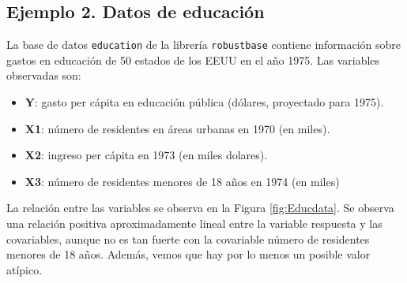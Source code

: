 \documentclass[
]{article}
\newenvironment{Shaded}{\begin{snugshade}}{\end{snugshade}}
\newcommand{\CommentTok}[1]{\textcolor[rgb]{0.56,0.35,0.01}{\textit{#1}}}
\newcommand{\DecValTok}[1]{\textcolor[rgb]{0.00,0.00,0.81}{#1}}
\newcommand{\FunctionTok}[1]{\textcolor[rgb]{0.13,0.29,0.53}{\textbf{#1}}}
\newcommand{\NormalTok}[1]{#1}
\newcommand{\OtherTok}[1]{\textcolor[rgb]{0.56,0.35,0.01}{#1}}
\newcommand{\SpecialCharTok}[1]{\textcolor[rgb]{0.81,0.36,0.00}{\textbf{#1}}}
\newcommand{\StringTok}[1]{\textcolor[rgb]{0.31,0.60,0.02}{#1}}
\providecommand{\tightlist}{%
  \setlength{\itemsep}{0pt}\setlength{\parskip}{0pt}}
\begin{document}
\hypertarget{ejemplo-2.-datos-de-educaciuxf3n}{%
\subsection*{Ejemplo 2. Datos de educación}\label{ejemplo-2.-datos-de-educaciuxf3n}}

La base de datos \texttt{education} de la librería \texttt{robustbase} contiene información sobre gastos en educación de 50 estados de los EEUU en el año 1975. Las variables observadas son:

\begin{itemize}
\tightlist
\item
  \textbf{Y}: gasto per cápita en educación pública (dólares, proyectado para 1975).
\item
  \textbf{X1}: número de residentes en áreas urbanas en 1970 (en miles).
\item
  \textbf{X2}: ingreso per cápita en 1973 (en miles dolares).
\item
  \textbf{X3}: número de residentes menores de 18 años en 1974 (en miles)
\end{itemize}

La relación entre las variables se observa en la Figura \ref{fig:Educdata}. Se observa una relación positiva aproximadamente lineal entre la variable respuesta y las covariables, aunque no es tan fuerte con la covariable número de residentes menores de 18 años. Además, vemos que hay por lo menos un posible valor atípico.

\begin{Shaded}
\end{Shaded}
\end{document}
